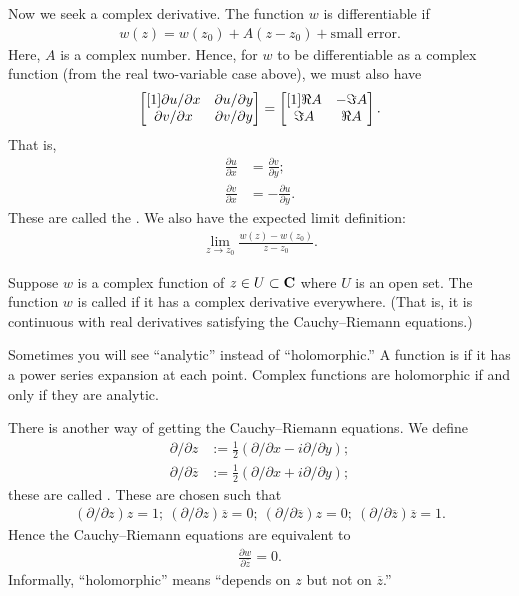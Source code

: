 \documentclass[11pt, oneside,margin=1in]{article}
\begin{document}
Now we seek a complex derivative. The function $w$ is differentiable if 
\begin{align*}
	w(z) = w (z_0) + A (z-z_0) + \textrm{small error}.
\end{align*}
Here, $A$ is a complex number. Hence, for $w$ to be differentiable as a complex function (from the real two-variable case above), we must also have
\begin{align*}
	\begin{bmatrix} [1] \partial u/\partial x&\partial u/\partial y\\ \partial v/\partial x&\partial v / \partial y\end{bmatrix} = \begin{bmatrix} [1] \Re A &- \Im A\\ \Im A & \Re A\end{bmatrix}.
\end{align*}
That is,
\begin{align*}
	\frac{\partial u}{\partial x} &= \frac{\partial v}{\partial y};\\
	\frac{\partial v}{\partial x}& = - \frac{\partial u}{\partial y}.
\end{align*}
These are called the . We also have the expected limit definition:
\begin{align*}
	\lim_{z\to z_0} \frac{w(z) - w (z_0)}{z-z_0}.
\end{align*}

\begin{definition}[ ]\label{}\text{}
Suppose $w$ is a complex function of $z\in U\subset \mathbf C$ where $U$ is an open set. The function $w$ is called  if it has a complex derivative everywhere. (That is, it is continuous with real derivatives satisfying the Cauchy--Riemann equations.)
\end{definition}

\begin{remark}
	Sometimes you will see ``analytic'' instead of ``holomorphic.'' A function is  if it has a power series expansion at each point. Complex functions are holomorphic if and only if they are analytic. 
\end{remark}

There is another way of getting the Cauchy--Riemann equations. We define
\begin{align*}
	\partial/\partial z &:= \frac{1}{2}(\partial/\partial x -  i\partial/\partial y);\\
		\partial/\partial \overline{z} &:= \frac{1}{2}(\partial/\partial x + i \partial/\partial y);
\end{align*}
these are called . These are chosen such that 
\begin{align*}
	(\partial /\partial z)z = 1;\  (\partial /\partial z) \overline{z} = 0;\  (\partial /\partial \overline{z}) z = 0;\  (\partial /\partial \overline{z})\overline{z} =1. 
\end{align*}
Hence the Cauchy--Riemann equations are equivalent to
\begin{align*}
	\frac{\partial w}{\partial \overline{z}} = 0.
\end{align*}
Informally, ``holomorphic'' means ``depends on $z$ but not on $\overline{z}$.'' 
\end{document}
